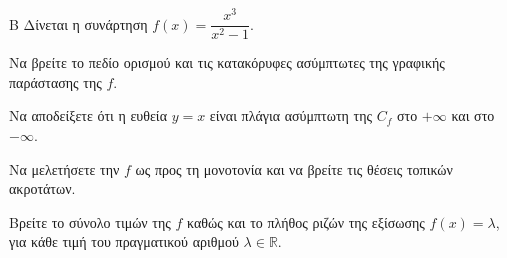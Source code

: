 \begin{thema}{Β}
Δίνεται η συνάρτηση $f(x) = \dfrac{x^3}{x^2-1}$.
\begin{erwthma}
\item Να βρείτε το πεδίο ορισμού και τις κατακόρυφες ασύμπτωτες της γραφικής παράστασης της $f$.
\item Να αποδείξετε ότι η ευθεία $y = x$ είναι πλάγια ασύμπτωτη της $C_f$ στο $+\infty$ και στο $-\infty$.
\item Να μελετήσετε την $f$ ως προς τη μονοτονία και να βρείτε τις θέσεις τοπικών ακροτάτων.
\item Βρείτε το σύνολο τιμών της $f$ καθώς και το πλήθος ριζών της εξίσωσης $f(x)=\lambda$, για κάθε τιμή του πραγματικού αριθμού $\lambda\in\mathbb{R}$.
\end{erwthma}
\end{thema}

